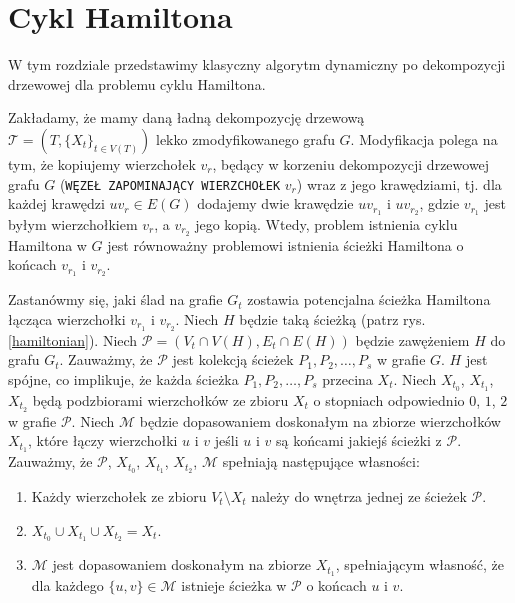 \documentclass[12pt, oneside]{report}
\begin{document}
    	\section{Cykl Hamiltona}
    	
W tym rozdziale przedstawimy klasyczny algorytm dynamiczny po dekompozycji drzewowej dla problemu cyklu Hamiltona. 

Zakładamy, że mamy daną ładną dekompozycję drzewową $\mathcal{T} = (T, \{X_t\}_{t \in V(T)})$ lekko zmodyfikowanego grafu $G$. Modyfikacja polega na tym, że kopiujemy wierzchołek $v_r$, będący w korzeniu dekompozycji drzewowej grafu $G$ (\texttt{WĘZEŁ ZAPOMINAJĄCY WIERZCHOŁEK} $v_r$) wraz z jego krawędziami, tj. dla każdej krawędzi $uv_r \in E(G)$ dodajemy dwie krawędzie $uv_{r_1}$ i $uv_{r_2}$, gdzie $v_{r_1}$ jest byłym wierzchołkiem $v_r$, a $v_{r_2}$ jego kopią. Wtedy, problem istnienia cyklu Hamiltona w $G$ jest równoważny problemowi istnienia ścieżki Hamiltona o końcach $v_{r_1}$ i $v_{r_2}$.

Zastanówmy się, jaki ślad na grafie $G_t$ zostawia potencjalna ścieżka Hamiltona łącząca wierzchołki $v_{r_1}$ i $v_{r_2}$. Niech $H$ będzie taką ścieżką (patrz rys. \ref{hamiltonian}). Niech $\mathcal{P} = (V_t \cap V(H), E_t \cap E(H))$ będzie zawężeniem $H$ do grafu $G_t$. Zauważmy, że $\mathcal{P}$ jest kolekcją ścieżek $P_1, P_2, \ldots, P_s$ w grafie $G$. $H$ jest spójne, co implikuje, że każda ścieżka $P_1, P_2, \ldots, P_s$ przecina $X_t$. Niech $X_{t_0}$, $X_{t_1}$, $X_{t_2}$ będą podzbiorami wierzchołków ze zbioru $X_t$ o stopniach odpowiednio $0$, $1$, $2$ w grafie $\mathcal{P}$. Niech $\mathcal{M}$ będzie dopasowaniem doskonałym na zbiorze wierzchołków $X_{t_1}$, które łączy wierzchołki $u$ i $v$ jeśli $u$ i $v$ są końcami jakiejś ścieżki z $\mathcal{P}$. Zauważmy, że $\mathcal{P}$, $X_{t_0}$, $X_{t_1}$, $X_{t_2}$, $\mathcal{M}$ spełniają następujące własności:
\begin{enumerate}[label=(\roman*)]
\item \label{i}{Każdy wierzchołek ze zbioru $V_t \setminus X_t$ należy do wnętrza jednej ze ścieżek $\mathcal{P}$.}
\item{$X_{t_0} \cup X_{t_1} \cup X_{t_2} = X_t$.}
\item \label{iii}{$\mathcal{M}$ jest dopasowaniem doskonałym na zbiorze $X_{t_1}$, spełniającym własność, że dla każdego $\{u, v\} \in \mathcal{M}$ istnieje ścieżka w $\mathcal{P}$ o końcach $u$ i $v$.}
\end{enumerate} 
\end{document}
